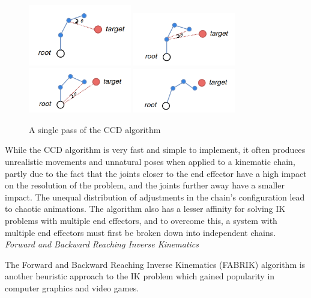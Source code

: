 \begin{figure}
    \centering
    \captionsetup{justification=centering}
    \includegraphics[width=0.4\textwidth]{grafika/ccd_1}
    \includegraphics[width=0.4\textwidth]{grafika/ccd_2}
    \includegraphics[width=0.4\textwidth]{grafika/ccd_3}
    \includegraphics[width=0.4\textwidth]{grafika/ccd_4}
    \caption{A single pass of the CCD algorithm}
    \label{fig:ccd}
\end{figure}

While the CCD algorithm is very fast and simple to implement, it often produces
unrealistic movements and unnatural poses when applied to a kinematic chain,
partly due to the fact that the joints closer to the end effector have a high
impact on the resolution of the problem, and the joints further away have
a smaller impact. The unequal distribution of adjustments in the chain's
configuration lead to chaotic animations. The algorithm also has a lesser
affinity for solving IK problems with multiple end effectors, and to overcome
this, a system with multiple end effectors must first be broken down into
independent chains. \\

\noindent\textit{Forward and Backward Reaching Inverse Kinematics}

The Forward and Backward Reaching Inverse Kinematics (FABRIK) algorithm
\cite{Aristidou2011} is another heuristic approach to the IK problem which
gained popularity in computer graphics and video games. 

